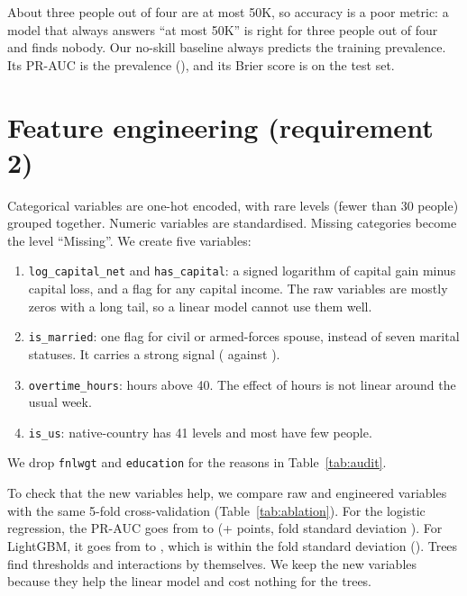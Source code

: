\documentclass[11pt,a4paper]{article}
\begin{document}
\begin{table}[H]
\centering\small

\caption{Stratified split.}\label{tab:split}
\end{table}

About three people out of four are at most 50K, so accuracy is a poor metric: a model that always answers ``at most 50K'' is right for three people out of four and finds nobody. Our no-skill baseline always predicts the training prevalence. Its PR-AUC is the prevalence (\cvDummyNone), and its Brier score is \brierNoSkill{} on the test set.

\section{Feature engineering (requirement 2)}
Categorical variables are one-hot encoded, with rare levels (fewer than 30 people) grouped together. Numeric variables are standardised. Missing categories become the level ``Missing''. We create five variables:
\begin{enumerate}
\item \texttt{log\_capital\_net} and \texttt{has\_capital}: a signed logarithm of capital gain minus capital loss, and a flag for any capital income. The raw variables are mostly zeros with a long tail, so a linear model cannot use them well.
\item \texttt{is\_married}: one flag for civil or armed-forces spouse, instead of seven marital statuses. It carries a strong signal (\posMarried{} against \posNotMarried{}).
\item \texttt{overtime\_hours}: hours above 40. The effect of hours is not linear around the usual week.
\item \texttt{is\_us}: native-country has 41 levels and most have few people.
\end{enumerate}
We drop \texttt{fnlwgt} and \texttt{education} for the reasons in Table~\ref{tab:audit}.

To check that the new variables help, we compare raw and engineered variables with the same 5-fold cross-validation (Table~\ref{tab:ablation}). For the logistic regression, the PR-AUC goes from \ablLogRaw{} to \ablLogEng{} (+\ablLogGain{} points, fold standard deviation \ablLogSd). For LightGBM, it goes from \ablLgbRaw{} to \ablLgbEng{}, which is within the fold standard deviation (\ablLgbSd). Trees find thresholds and interactions by themselves. We keep the new variables because they help the linear model and cost nothing for the trees.
\end{document}
